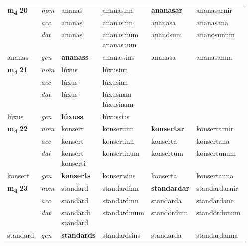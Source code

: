 \begin{longtable}[l]{llllll}
\multirow{3}{*}{{{\textbf{m{\textsubscript{4}}} \Large{\textbf{20}}}}}  & {\footnotesize{{\textit{nom}}}} & ananas & ananasinn    & \textbf{ananasar} & ananasarnir  \\*
 &  {\footnotesize{{\textit{acc}}}} & ananas  & ananasinn   & ananasa  & ananasana \\*
 &  {\footnotesize{{\textit{dat}}}} & ananas & \specialcell{ananasinum\\ ananasnum}   & ananösum & ananösunum \\*
 {\footnotesize{ananas}} &   {\footnotesize{{\textit{gen}}}} & \textbf{ananass}  & ananassins  & ananasa & ananasanna \\
\cmidrule{1-6}


\multirow{3}{*}{{{\textbf{m{\textsubscript{4}}} \Large{\textbf{21}}}}}  & {\footnotesize{{\textit{nom}}}} & lúxus & lúxusinn    & \textbf{} &   \\*
 &  {\footnotesize{{\textit{acc}}}} & lúxus  & lúxusinn   &   &  \\*
 &  {\footnotesize{{\textit{dat}}}} & lúxus & \specialcell{lúxusnum\\ lúxusinum}   &  &  \\*
 {\footnotesize{lúxus}} &   {\footnotesize{{\textit{gen}}}} & \textbf{lúxuss}  & lúxussins  &  &  \\
\cmidrule{1-6}


\multirow{3}{*}{{{\textbf{m{\textsubscript{4}}} \Large{\textbf{22}}}}}  & {\footnotesize{{\textit{nom}}}} & konsert & konsertinn    & \textbf{konsertar} & konsertarnir  \\*
 &  {\footnotesize{{\textit{acc}}}} & konsert  & konsertinn   & konserta  & konsertana \\*
 &  {\footnotesize{{\textit{dat}}}} & \specialcell{konsert\\ konserti} & konsertinum   & konsertum & konsertunum \\*
 {\footnotesize{konsert}} &   {\footnotesize{{\textit{gen}}}} & \textbf{konserts}  & konsertsins  & konserta & konsertanna \\
\cmidrule{1-6}


\multirow{3}{*}{{{\textbf{m{\textsubscript{4}}} \Large{\textbf{23}}}}}  & {\footnotesize{{\textit{nom}}}} & standard & standardinn    & \textbf{standardar} & standardarnir  \\*
 &  {\footnotesize{{\textit{acc}}}} & standard  & standardinn   & standarda  & standardana \\*
 &  {\footnotesize{{\textit{dat}}}} & \specialcell{standardi\\ standard} & standardinum   & standördum & standördunum \\*
 {\footnotesize{standard}} &   {\footnotesize{{\textit{gen}}}} & \textbf{standards}  & standardsins  & standarda & standardanna \\
\cmidrule{1-6}



\end{longtable}
